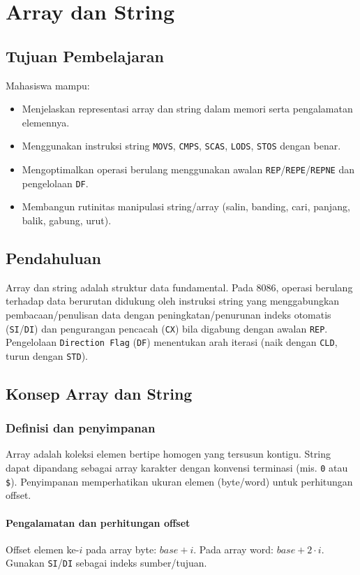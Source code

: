\chapter{Array dan String}

\section{Tujuan Pembelajaran}
Mahasiswa mampu:
\begin{itemize}
    \item Menjelaskan representasi array dan string dalam memori serta pengalamatan elemennya.
    \item Menggunakan instruksi string \texttt{MOVS}, \texttt{CMPS}, \texttt{SCAS}, \texttt{LODS}, \texttt{STOS} dengan benar.
    \item Mengoptimalkan operasi berulang menggunakan awalan \texttt{REP}/\texttt{REPE}/\texttt{REPNE} dan pengelolaan \texttt{DF}.
    \item Membangun rutinitas manipulasi string/array (salin, banding, cari, panjang, balik, gabung, urut).
\end{itemize}

\section{Pendahuluan}
Array dan string adalah struktur data fundamental. Pada 8086, operasi berulang terhadap data berurutan didukung oleh instruksi string yang menggabungkan pembacaan/penulisan data dengan peningkatan/penurunan indeks otomatis (\texttt{SI}/\texttt{DI}) dan pengurangan pencacah (\texttt{CX}) bila digabung dengan awalan \texttt{REP}. Pengelolaan \texttt{Direction Flag} (\texttt{DF}) menentukan arah iterasi (naik dengan \texttt{CLD}, turun dengan \texttt{STD}).

\section{Konsep Array dan String}
\subsection{Definisi dan penyimpanan}
Array adalah koleksi elemen bertipe homogen yang tersusun kontigu. String dapat dipandang sebagai array karakter dengan konvensi terminasi (mis. \texttt{0} atau \texttt{\$}). Penyimpanan memperhatikan ukuran elemen (byte/word) untuk perhitungan offset.

\subsubsection{Pengalamatan dan perhitungan offset}
Offset elemen ke-\(i\) pada array byte: \(base + i\). Pada array word: \(base + 2\cdot i\). Gunakan \texttt{SI}/\texttt{DI} sebagai indeks sumber/tujuan.

